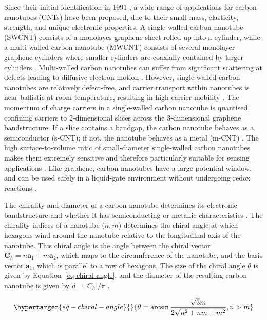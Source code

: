 \documentclass[
  a4paper,
]{scrbook}
\begin{document}
Since their initial identification in 1991 \autocite{Iijima1991}, a wide
range of applications for carbon nanotubes (CNTs) have been proposed,
due to their small mass, elasticity, strength, and unique electronic
properties. A single-walled carbon nanotube (SWCNT) consists of a
monolayer graphene sheet rolled up into a cylinder, while a multi-walled
carbon nanotube (MWCNT) consists of several monolayer graphene cylinders
where smaller cylinders are coaxially contained by larger cylinders
\autocite{Dekker1999,Avouris2007,Cao2009,Rouhi2010,Shkodra2021}.
Multi-walled carbon nanotubes can suffer from significant scattering at
defects leading to diffusive electron motion \autocite{Dekker1999}.
However, single-walled carbon nanotubes are relatively defect-free, and
carrier transport within nanotubes is near-ballistic at room
temperature, resulting in high carrier mobility
\autocite{Dekker1999,Avouris2007,Cao2009,Rouhi2010,Shkodra2021}. The
momentum of charge carriers in a single-walled carbon nanotube is
quantised, confining carriers to 2-dimensional slices across the
3-dimensional graphene bandstructure. If a slice contains a bandgap, the
carbon nanotube behaves as a semiconductor (s-CNT); if not, the nanotube
behaves as a metal (m-CNT) \autocite{McEuen2002}. The high
surface-to-volume ratio of small-diameter single-walled carbon nanotubes
makes them extremely sensitive and therefore particularly suitable for
sensing applications \autocite{Cao2009,Yao2021,Shkodra2021}. Like
graphene, carbon nanotubes have a large potential window, and can be
used safely in a liquid-gate environment without undergoing redox
reactions \autocite{Ohno2015}.

The chirality and diameter of a carbon nanotube determines its
electronic bandstructure and whether it has semiconducting or metallic
characteristics
\autocite{Martel1998,Dekker1999,McEuen2002,Avouris2007,Shkodra2021,Li2023}.
The chirality indices of a nanotube (\(n, m\)) determines the chiral
angle at which hexagons wind around the nanotube relative to the
longitudinal axis of the nanotube. This chiral angle is the angle
between the chiral vector
\(\textbf{C}_h = n\textbf{a}_1+m\textbf{a}_2\), which maps to the
circumference of the nanotube, and the basis vector \(\textbf{a}_1\),
which is parallel to a row of hexagons. The size of the chiral angle
\(\theta\) is given by Equation~\ref{eq-chiral-angle}, and the diameter
of the resulting carbon nanotube is given by \(d=|C_h|/\pi\)
\autocite{Lu2012}.

\begin{equation}\protect\hypertarget{eq-chiral-angle}{}{
\theta = \arcsin\frac{\sqrt{3}m}{2\sqrt{n^2+nm+m^2}}, \space n > m
}\label{eq-chiral-angle}\end{equation}
\end{document}
